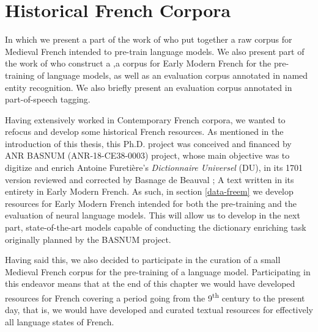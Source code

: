 \chapter{Historical French Corpora}

\begin{center}
    \begin{minipage}{0.66\textwidth}
        \begin{small}
            In which we present a part of the work of \citet{grobol-etal-2022-bertrade} who put together a raw corpus for Medieval French intended to pre-train language models. We also present part of the work of \citet{gabay-etal-2022-from} who construct a \freemmax,a corpus for Early Modern French for the pre-training of language models, as well as \freemner an evaluation corpus annotated in named entity recognition. We also briefly present \freemlpm an evaluation corpus annotated in part-of-speech tagging.
        \end{small}
    \end{minipage}
    \vspace{0.5cm}
\end{center}

Having extensively worked in Contemporary French corpora, we wanted to refocus and develop some historical French resources. As mentioned in the introduction of this thesis, this Ph.D. project was conceived and financed by ANR BASNUM (ANR-18-CE38-0003) project, whose main objective was to digitize and enrich Antoine Furetière's \emph{Dictionnaire Universel} (DU), in its 1701 version reviewed and corrected by Basnage de Beauval \citep{furetiere-1701-dictionnaire}; A text written in its entirety in Early Modern French. As such, in section \ref{data-freem} we develop resources for Early Modern French intended for both the pre-training and the evaluation of neural language models. This will allow us to develop in the next part, state-of-the-art models capable of conducting the dictionary enriching task originally planned by the BASNUM project.

Having said this, we also decided to participate in the curation of a small Medieval French corpus for the pre-training of a language model. Participating in this endeavor means that at the end of this chapter we would have developed resources for French covering a period going from the 9\textsuperscript{th} century to the present day, that is, we would have developed and curated textual resources for effectively all language states of French.

